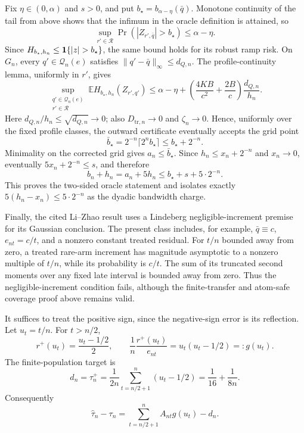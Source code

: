 Fix \(\eta\in(0,\alpha)\) and \(s>0\), and put
\(b_\star=b_{\alpha-\eta}(\bar q)\).
Monotone continuity of the tail from above shows that the infimum in the oracle definition is attained, so
\[
 \sup_{r'\in\mathcal R}\Pr(|Z_{r',\bar q}|>b_\star)
 \leq\alpha-\eta.
\]
Since \(H_{b_\star,h_n}\leq{\bf1}\{|z|>b_\star\}\), the same bound holds for its robust ramp risk.  On \(G_n\), every \(q'\in\mathcal Q_n(e)\) satisfies
\(\|q'-\bar q\|_\infty\leq d_{Q,n}\).  The profile-continuity lemma, uniformly in \(r'\), gives
\[
 \sup_{\substack{q'\in\mathcal Q_n(e)\\r'\in\mathcal R}}
 \mathbb EH_{b_\star,h_n}(Z_{r',q'})
 \leq\alpha-\eta+
 \left(\frac{4KB}{c^2}+\frac{2B}{c}\right)\frac{d_{Q,n}}{h_n}.
\]
Here \(d_{Q,n}/h_n\leq\sqrt{d_{Q,n}}\to0\);
also \(D_{\mathrm{tr},n}\to0\) and \(\zeta_n\to0\).
Hence, uniformly over the fixed profile classes, the outward certificate eventually accepts the grid point
\[
 \bar b_\star=2^{-n}\lceil2^n b_\star\rceil
 \leq b_\star+2^{-n}.
\]
Minimality on the corrected grid gives \(a_n\leq\bar b_\star\).  Since
\(h_n\leq x_n+2^{-n}\) and \(x_n\to0\), eventually
\(5x_n+2^{-n}\leq s\), and therefore
\[
 b_n+h_n=a_n+5h_n
 \leq b_\star+s+5\cdot2^{-n}.
\]
This proves the two-sided oracle statement and isolates exactly
\(5(h_n-x_n)\leq5\cdot2^{-n}\) as the dyadic bandwidth charge.

Finally, the cited Li--Zhao result uses a Lindeberg negligible-increment premise for its Gaussian conclusion.  The present class includes, for example,
\(\bar q\equiv c\), \(e_{nt}=c/t\), and a nonzero constant treated residual.
For \(t/n\) bounded away from zero, a treated rare-arm increment has magnitude asymptotic to a nonzero multiple of \(t/n\), while its probability is \(c/t\).
The sum of its truncated second moments over any fixed late interval is bounded away from zero.  Thus the negligible-increment condition fails, although the finite-transfer and atom-safe coverage proof above remains valid.

It suffices to treat the positive sign, since the negative-sign error is its reflection.  Let \(u_t=t/n\).  For \(t>n/2\),
\[
 r^+(u_t)=\frac{u_t-1/2}{2},\qquad
 \frac1n\frac{r^+(u_t)}{e_{nt}}=u_t(u_t-1/2)=:g(u_t).
\]
The finite-population target is
\[
 d_n=\tau_n^+
 =\frac1{2n}\sum_{t=n/2+1}^n(u_t-1/2)
 =\frac1{16}+\frac1{8n}.
\]
Consequently
\[
 \widehat\tau_n-\tau_n
 =\sum_{t=n/2+1}^n A_{nt}g(u_t)-d_n.
\]

